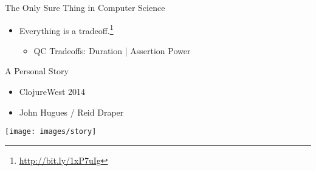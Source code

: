 \documentclass[presentation, bigger]{beamer}
\begin{document}
\begin{frame}[label=sec-]{The Only Sure Thing in Computer Science}
\begin{itemize}
\item Everything is a tradeoff.\footnote{\url{http://bit.ly/1xP7uIg}}
\begin{itemize}
\item QC Tradeoffs: Duration | Assertion Power
\end{itemize}
\end{itemize}
\end{frame}
\begin{frame}[label=sec-]{A Personal Story}
\begin{itemize}
\item ClojureWest 2014

\item John Hugues / Reid Draper
\end{itemize}

\begin{center}
 \texttt{[image: images/story]}
\end{center}
\end{frame}
\end{document}

